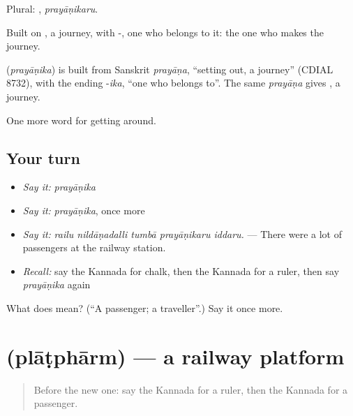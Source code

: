 Plural: , \emph{prayāṇikaru}.

Built on , a journey, with -, one who belongs to it: the one who makes the journey.

\begin{cousinweb}
\textbf{} (\emph{prayāṇika}) is built from Sanskrit \emph{prayāṇa}, \textquotedblleft{}setting out, a journey\textquotedblright{} (CDIAL 8732), with the ending -\emph{ika}, \textquotedblleft{}one who belongs to\textquotedblright{}. The same \emph{prayāṇa} gives , a journey.
\end{cousinweb}

\begin{grammarlens}[title={What you've built}]
One more word for getting around.
\end{grammarlens}

\subsection*{Your turn}
\begin{itemize}
\raggedright
  \item \emph{Say it:} \emph{prayāṇika}
  \item \emph{Say it:} \emph{prayāṇika}, once more
  \item \emph{Say it:} \emph{railu nildāṇadalli tumbā prayāṇikaru iddaru.} — There were a lot of passengers at the railway station.
  \item \emph{Recall:} say the Kannada for chalk, then the Kannada for a ruler, then say \emph{prayāṇika} again
\end{itemize}

\begin{tcolorbox}[breakable,colback=teal!4,colframe=teal!35!black,title={Before you move on}]
What does  mean? (\textquotedblleft{}A passenger; a traveller\textquotedblright{}.) Say it once more.
\end{tcolorbox}
\section[\texorpdfstring{\kn{ಪ್ಲಾಟ್ಫಾರ್ಮ್} (plāṭphārm)}{ಪ್ಲಾಟ್ಫಾರ್ಮ್ (plāṭphārm)}]{ (plāṭphārm) — a railway platform}

\label{lesson:KA-C433-platpharm}



\begin{quote}
Before the new one: say the Kannada for a ruler, then the Kannada for a passenger.
\end{quote}

